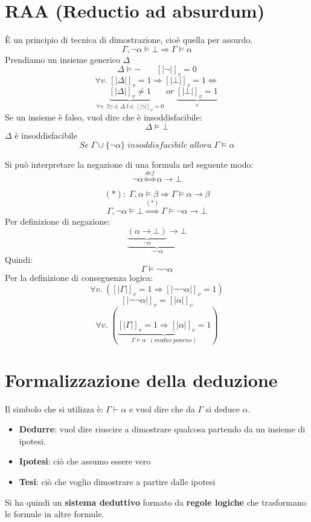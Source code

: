 \documentclass{article}
\theoremstyle{break}
\theoremstyle{break}
\theoremstyle{break}
\theoremstyle{break}
\begin{document}
\section{RAA (Reductio ad absurdum)}
È un principio di tecnica di dimostrazione, cioè quella per assurdo.
\[
\Gamma, \neg \alpha \models \bot \Rightarrow \Gamma \models \alpha
\] 
Prendiamo un insieme generico \( \Delta \) 
\[
    \Delta \models \neg \;\;\;\;\;\;\; [|\neg|]_v=0
\] 
\[
    \forall v.\; [|\Delta|]_v=1 \Rightarrow [|\bot|]_v=1 \Leftrightarrow
\] 
\[
    \underbrace{[|\Delta|]_v \neq 1}_{\forall v.\; \exists \gamma \in \Delta\; t.c.\; [|\gamma|]_v=0}\; or\; \underbrace{[|\bot|]_v=1}_{ \times }
\] 
Se un insieme è falso, vuol dire che è insoddisfacibile:
\[
\Delta \models \bot
\] 
\( \Delta \) è insoddisfacibile
\[
    Se\; \Gamma \cup \{ \neg \alpha \}\; insoddisfacibile\; allora\; \Gamma \models \alpha
\] 
\begin{definition}
    Si può interpretare la negazione di una formula nel seguente modo:
    \[
        \neg \alpha \stackrel{def}{\Leftrightarrow} \alpha \to \bot
    \] 
\end{definition}

\[
(*):\; \Gamma, \alpha \models \beta \Rightarrow \Gamma \models \alpha \to \beta
\] 
\[
    \Gamma, \neg \alpha \models \bot \stackrel{(*)}{\Rightarrow} \Gamma \models \neg \alpha \to \bot
\] 
Per definizione di negazione:
\[
    \underbrace{ \underbrace{(\alpha \to \bot)}_{\neg \alpha} \to \bot}_{\neg \neg \alpha}
\] 
Quindi:
\[
\Gamma \models \neg \neg \alpha
\] 
Per la definizione di conseguenza logica:
\[
    \forall v.\; ([|\Gamma|]_v=1 \Rightarrow [|\neg \neg \alpha|]_v=1)
\] 
\[
    [|\neg \neg \alpha|]_v=[|\alpha|]_v
\] 
\[
    \forall v.\; (\underbrace{[|\Gamma|]_v=1 \Rightarrow [|\alpha|]_v=1}_{\Gamma \models \alpha\;\;(modus\;ponens)})
\] 



\section{Formalizzazione della deduzione}
Il simbolo che si utilizza è: \( \Gamma \vdash \alpha\) e vuol dire che da
\( \Gamma \) si deduce \( \alpha \).

\begin{definition}
    \begin{itemize}
         \item \textbf{Dedurre}: vuol dire riuscire a dimostrare qualcosa partendo da un insieme di ipotesi.
         \item \textbf{Ipotesi}: ciò che assumo essere vero   
         \item \textbf{Tesi}: ciò che voglio dimostrare a partire dalle ipotesi
    \end{itemize}
\end{definition}
Si ha quindi un \textbf{sistema deduttivo} formato da \textbf{regole logiche} che
trasformano le formule in altre formule.
\end{document}
